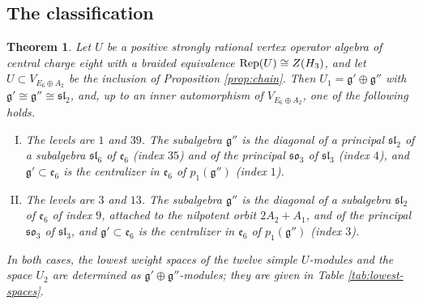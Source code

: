 \documentclass[leqno]{article}
\let\cal\relax
\newcommand{\cal}{\mathcal}
\DeclareMathOperator{\Rep}{Rep}
\newtheorem{thm}{Theorem}[section]
\numberwithin{equation}{section}
\begin{document}
\subsection{The classification}

\begin{thm}
\label{thm:weight-one-classification}
Let $U$ be a positive strongly rational vertex operator algebra of central charge eight with a braided equivalence $\Rep(U) \cong Z(\cal H_3)$, and let $U \subset V_{E_6 \oplus A_2}$ be the inclusion of Proposition \ref{prop:chain}. Then $U_1 = \mathfrak g' \oplus \mathfrak g''$ with $\mathfrak g' \cong \mathfrak g'' \cong \mathfrak{sl}_2$, and, up to an inner automorphism of $V_{E_6 \oplus A_2}$, one of the following holds.
\begin{enumerate}[(I)]
\item The levels are $1$ and $39$. The subalgebra $\mathfrak g''$ is the diagonal of a principal $\mathfrak{sl}_2$ of a subalgebra $\mathfrak{sl}_6$ of $\mathfrak e_6$ (index $35$) and of the principal $\mathfrak{so}_3$ of $\mathfrak{sl}_3$ (index $4$), and $\mathfrak g' \subset \mathfrak e_6$ is the centralizer in $\mathfrak e_6$ of $p_1(\mathfrak g'')$ (index $1$).
\item The levels are $3$ and $13$. The subalgebra $\mathfrak g''$ is the diagonal of a subalgebra $\mathfrak{sl}_2$ of $\mathfrak e_6$ of index $9$, attached to the nilpotent orbit $2A_2+A_1$, and of the principal $\mathfrak{so}_3$ of $\mathfrak{sl}_3$, and $\mathfrak g' \subset \mathfrak e_6$ is the centralizer in $\mathfrak e_6$ of $p_1(\mathfrak g'')$ (index $3$).
\end{enumerate}
In both cases, the lowest weight spaces of the twelve simple $U$-modules and the space $U_2$ are determined as $\mathfrak g' \oplus \mathfrak g''$-modules; they are given in Table \ref{tab:lowest-spaces}.
\end{thm}
\end{document}
